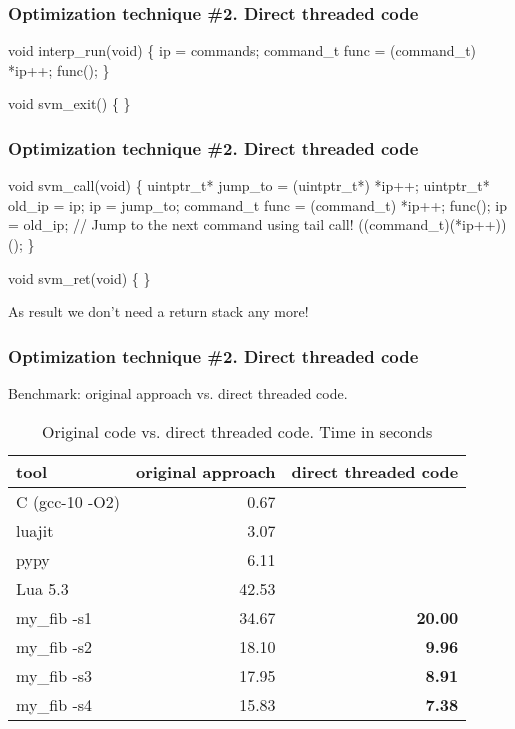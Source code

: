 \documentclass[hyperref={colorlinks=true},xcolor=table]{beamer}
\begin{document}
\begin{frame}[fragile]
  \frametitle{Optimization technique \#2. Direct threaded code}
  \begin{CodeNoLabel}
void interp_run(void) \{
    ip = commands;
    command_t func = (command_t) *ip++;
    func();
\}

void svm_exit() \{
\}
  \end{CodeNoLabel}
\end{frame}

\begin{frame}[fragile]
  \frametitle{Optimization technique \#2. Direct threaded code}
  \begin{CodeNoLabel}
void svm_call(void) \{
    uintptr_t* jump_to = (uintptr_t*) *ip++;
    uintptr_t* old_ip = ip;
    ip = jump_to;
    command_t func = (command_t) *ip++;
    func();
    ip = old_ip;
    // Jump to the next command using tail call!
    ((command_t)(*ip++))();
\}

void svm_ret(void) \{
\}
  \end{CodeNoLabel}
  As result we don't need a return stack any more!
\end{frame}

\begin{frame}[fragile]
  \frametitle{Optimization technique \#2. Direct threaded code}
  Benchmark: original approach vs. direct threaded code.
  \begin{table}
    \begin{tabular}{ | l | r | r | }
      \hline
      \rowcolor{lightgray} tool & original approach & direct threaded code \\
      \hline
      C (gcc-10 -O2) &  0.67 & \\
      luajit         &  3.07 & \\
      pypy           &  6.11 & \\
      Lua 5.3        & 42.53 & \\
      \hline
      my\_fib -s1   & 34.67 & \textbf{20.00} \\
      my\_fib -s2   & 18.10 & \textbf{9.96} \\
      my\_fib -s3   & 17.95 & \textbf{8.91} \\
      my\_fib -s4   & 15.83 & \textbf{7.38} \\
      \hline
    \end{tabular}
    \caption{Original code vs. direct threaded code. Time in seconds}
  \end{table}
\end{frame}
\end{document}
